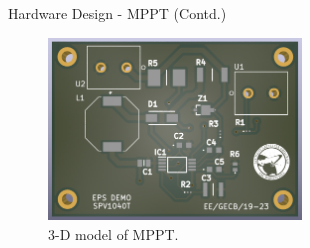 \documentclass[aspectratio=169]{beamer}
\begin{document}
 	\begin{frame}{Hardware Design - MPPT (Contd.)}
		\begin{figure}[h]
			\centering
			\includegraphics[width=0.6\textwidth]{diag/MpptDemo3d.png}
			\caption{3-D model of MPPT.}
			\label{fig:mesh1}
		\end{figure}
	\end{frame}

    
        
    
		
\end{document}
